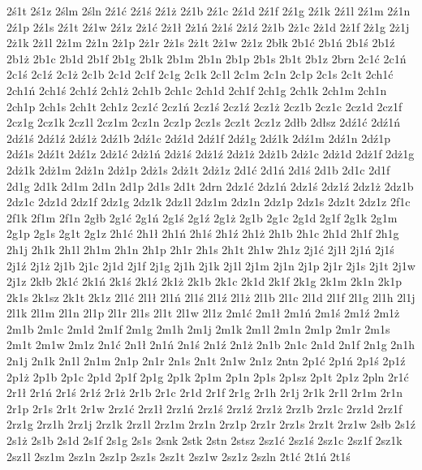{2\'s1t
2\'s1z
2\'slm
2\'sln
2\'z1\'c
2\'z1\'s
2\'z1\.z
2\'z1b
2\'z1c
2\'z1d
2\'z1f
2\'z1g
2\'z1k
2\'z1l
2\'z1m
2\'z1n
2\'z1p
2\'z1s
2\'z1t
2\'z1w
2\'z1z
2\.z1\'c
2\.z1\l 
2\.z1\'n
2\.z1\'s
2\.z1\'z
2\.z1b
2\.z1c
2\.z1d
2\.z1f
2\.z1g
2\.z1j
2\.z1k
2\.z1l
2\.z1m
2\.z1n
2\.z1p
2\.z1r
2\.z1s
2\.z1t
2\.z1w
2\.z1z
2b\l k
2b1\'c
2b1\'n
2b1\'s
2b1\'z
2b1\.z
2b1c
2b1d
2b1f
2b1g
2b1k
2b1m
2b1n
2b1p
2b1s
2b1t
2b1z
2brn
2c1\'c
2c1\'n
2c1\'s
2c1\'z
2c1\.z
2c1b
2c1d
2c1f
2c1g
2c1k
2c1l
2c1m
2c1n
2c1p
2c1s
2c1t
2ch1\'c
2ch1\'n
2ch1\'s
2ch1\'z
2ch1\.z
2ch1b
2ch1c
2ch1d
2ch1f
2ch1g
2ch1k
2ch1m
2ch1n
2ch1p
2ch1s
2ch1t
2ch1z
2cz1\'c
2cz1\'n
2cz1\'s
2cz1\'z
2cz1\.z
2cz1b
2cz1c
2cz1d
2cz1f
2cz1g
2cz1k
2cz1l
2cz1m
2cz1n
2cz1p
2cz1s
2cz1t
2cz1z
2d\l b
2d\l sz
2d\'z1\'c
2d\'z1\'n
2d\'z1\'s
2d\'z1\'z
2d\'z1\.z
2d\'z1b
2d\'z1c
2d\'z1d
2d\'z1f
2d\'z1g
2d\'z1k
2d\'z1m
2d\'z1n
2d\'z1p
2d\'z1s
2d\'z1t
2d\'z1z
2d\.z1\'c
2d\.z1\'n
2d\.z1\'s
2d\.z1\'z
2d\.z1\.z
2d\.z1b
2d\.z1c
2d\.z1d
2d\.z1f
2d\.z1g
2d\.z1k
2d\.z1m
2d\.z1n
2d\.z1p
2d\.z1s
2d\.z1t
2d\.z1z
2d1\'c
2d1\'n
2d1\'s
2d1b
2d1c
2d1f
2d1g
2d1k
2d1m
2d1n
2d1p
2d1s
2d1t
2drn
2dz1\'c
2dz1\'n
2dz1\'s
2dz1\'z
2dz1\.z
2dz1b
2dz1c
2dz1d
2dz1f
2dz1g
2dz1k
2dz1l
2dz1m
2dz1n
2dz1p
2dz1s
2dz1t
2dz1z
2f1c
2f1k
2f1m
2f1n
2g\l b
2g1\'c
2g1\'n
2g1\'s
2g1\'z
2g1\.z
2g1b
2g1c
2g1d
2g1f
2g1k
2g1m
2g1p
2g1s
2g1t
2g1z
2h1\'c
2h1\l 
2h1\'n
2h1\'s
2h1\'z
2h1\.z
2h1b
2h1c
2h1d
2h1f
2h1g
2h1j
2h1k
2h1l
2h1m
2h1n
2h1p
2h1r
2h1s
2h1t
2h1w
2h1z
2j1\'c
2j1\l 
2j1\'n
2j1\'s
2j1\'z
2j1\.z
2j1b
2j1c
2j1d
2j1f
2j1g
2j1h
2j1k
2j1l
2j1m
2j1n
2j1p
2j1r
2j1s
2j1t
2j1w
2j1z
2k\l b
2k1\'c
2k1\'n
2k1\'s
2k1\'z
2k1\.z
2k1b
2k1c
2k1d
2k1f
2k1g
2k1m
2k1n
2k1p
2k1s
2k1sz
2k1t
2k1z
2l1\'c
2l1\l 
2l1\'n
2l1\'s
2l1\'z
2l1\.z
2l1b
2l1c
2l1d
2l1f
2l1g
2l1h
2l1j
2l1k
2l1m
2l1n
2l1p
2l1r
2l1s
2l1t
2l1w
2l1z
2m1\'c
2m1\l 
2m1\'n
2m1\'s
2m1\'z
2m1\.z
2m1b
2m1c
2m1d
2m1f
2m1g
2m1h
2m1j
2m1k
2m1l
2m1n
2m1p
2m1r
2m1s
2m1t
2m1w
2m1z
2n1\'c
2n1\l 
2n1\'n
2n1\'s
2n1\'z
2n1\.z
2n1b
2n1c
2n1d
2n1f
2n1g
2n1h
2n1j
2n1k
2n1l
2n1m
2n1p
2n1r
2n1s
2n1t
2n1w
2n1z
2ntn
2p1\'c
2p1\'n
2p1\'s
2p1\'z
2p1\.z
2p1b
2p1c
2p1d
2p1f
2p1g
2p1k
2p1m
2p1n
2p1s
2p1sz
2p1t
2p1z
2pln
2r1\'c
2r1\l 
2r1\'n
2r1\'s
2r1\'z
2r1\.z
2r1b
2r1c
2r1d
2r1f
2r1g
2r1h
2r1j
2r1k
2r1l
2r1m
2r1n
2r1p
2r1s
2r1t
2r1w
2rz1\'c
2rz1\l 
2rz1\'n
2rz1\'s
2rz1\'z
2rz1\.z
2rz1b
2rz1c
2rz1d
2rz1f
2rz1g
2rz1h
2rz1j
2rz1k
2rz1l
2rz1m
2rz1n
2rz1p
2rz1r
2rz1s
2rz1t
2rz1w
2s\l b
2s1\'z
2s1\.z
2s1b
2s1d
2s1f
2s1g
2s1s
2snk
2stk
2stn
2stsz
2sz1\'c
2sz1\'s
2sz1c
2sz1f
2sz1k
2sz1l
2sz1m
2sz1n
2sz1p
2sz1s
2sz1t
2sz1w
2sz1z
2szln
2t1\'c
2t1\'n
2t1\'s
}
